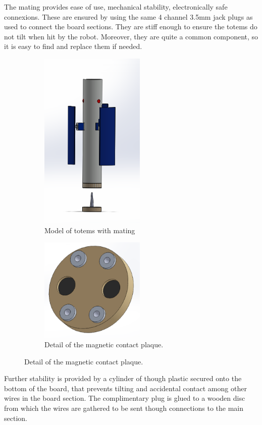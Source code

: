 \documentclass[a4paper,twoside]{book}
\begin{document}
The mating provides ease of use, mechanical stability, electronically safe connexions. These are ensured by using the same 4 channel 3.5mm jack plugs as used to connect the board sections. They are stiff enough to ensure the totems do not tilt when hit by the robot. Moreover, they are quite a common component, so it is easy to find and replace them if needed.

\begin{figure}
    \begin{subfigure}{6cm}
    \includegraphics[width=5cm]{img/totem_nuovo2}
    \captionsetup{width=4cm}
    \caption{Model of totems with mating}
	\end{subfigure}
	\begin{subfigure}{6cm}
    \includegraphics[width=5cm]{img/placca_contatto}
    \captionsetup{width=4cm}
    \caption{Detail of the magnetic contact plaque.}
    \end{subfigure}
\end{figure}

Further stability is provided by a cylinder of though plastic secured onto the bottom of the board, that prevents tilting and accidental contact among other wires in the board section. The complimentary plug is glued to a wooden disc from which the wires are gathered to be sent though connections to the main section.
\end{document}
